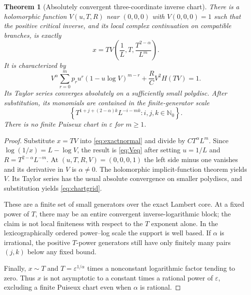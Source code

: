 \documentclass[11pt,a4paper]{article}
\numberwithin{equation}{section}
\newtheorem{theorem}{Theorem}[section]
\theoremstyle{definition}\newtheorem{definition}[theorem]{Definition}
\theoremstyle{remark}\newtheorem{remark}[theorem]{Remark}
\theoremstyle{definition}
\newcommand{\N}{\mathbb N}\newcommand{\E}{\mathbb E}
\begin{document}
\begin{theorem}[Absolutely convergent three-coordinate inverse chart]
\label{thm:chart}
There is a holomorphic function $V(u,T,R)$ near $(0,0,0)$ with
$V(0,0,0)=1$ such that the positive critical inverse, and its local complex
continuation on compatible branches, is exactly
\begin{equation}\label{eq:chart}
 x=T V\left(\frac1L,T,\frac{T^{2-\alpha}}{L^m}\right).
\end{equation}
It is characterized by
\begin{equation}\label{eq:Veq}
 V^\alpha\sum_{r=0}^m p_r u^r(1-u\log V)^{m-r}
       +\frac RC V^2H(TV)=1.
\end{equation}
Its Taylor series converges absolutely on a sufficiently small polydisc.
After substitution, its monomials are contained in the finite-generator
scale
\begin{equation}\label{eq:chartgrid}
 \left\{T^{1+j+(2-\alpha)k}L^{-i-mk}:i,j,k\in\N_0\right\}.
\end{equation}
There is no finite Puiseux chart in $\varepsilon$ for $m\ge1$.
\end{theorem}
\begin{proof}
Substitute $x=TV$ into \eqref{eq:exactnormal} and divide by
$C T^\alpha L^m$. Since $\log(1/x)=L-\log V$, the result is
\eqref{eq:Veq} after setting $u=1/L$ and $R=T^{2-\alpha}L^{-m}$.
At $(u,T,R,V)=(0,0,0,1)$ the left side minus one vanishes and its derivative
in $V$ is $\alpha\ne0$. The holomorphic implicit-function theorem yields
$V$. Its Taylor series has the usual absolute convergence on smaller
polydiscs, and substitution yields \eqref{eq:chartgrid}.

These are a finite set of small generators over the exact Lambert core.
At a fixed power of $T$, there may be an entire convergent inverse-logarithmic
block; the claim is not local finiteness with respect to the $T$ exponent
alone. In the lexicographically ordered power--log scale the support is
well based. If $\alpha$ is irrational, the positive $T$-power generators
still have only finitely many pairs $(j,k)$ below any fixed bound.

Finally, $x\sim T$ and
$T=\varepsilon^{1/\alpha}$ times a nonconstant logarithmic factor tending
to zero. Thus $x$ is not asymptotic to a constant times a rational power
of $\varepsilon$, excluding a finite Puiseux chart even when $\alpha$
is rational.
\end{proof}
\end{document}
